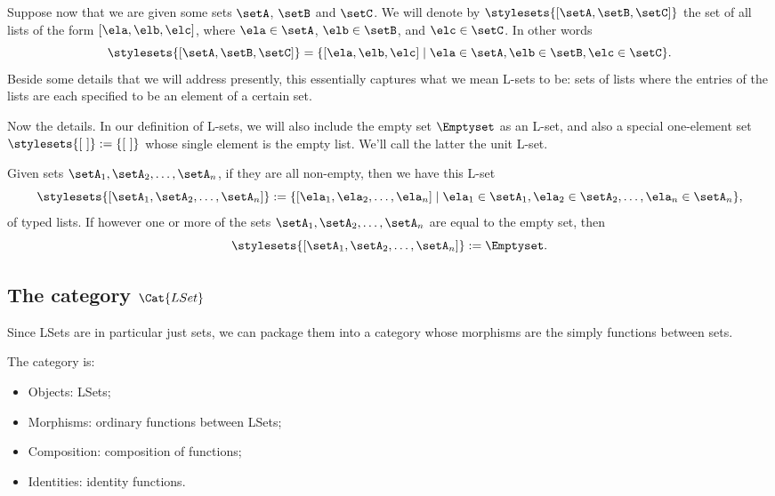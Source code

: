 Suppose now that we are given some sets $\setA$, $\setB$ and $\setC$.  We will denote by $\stylesets{[\setA, \setB, \setC]}$ the set of all lists of the form $[\ela, \elb, \elc]$, where $\ela \in \setA$, $\elb \in \setB$, and $\elc \in \setC$. In other words
\begin{equation}
\stylesets{[\setA, \setB, \setC]} = \{ [\ela, \elb, \elc] \mid \ela \in \setA, \elb \in \setB, \elc \in \setC \}.
\end{equation}
Beside some details that we will address presently, this essentially captures what we mean L-sets to be: sets of lists where the entries of the lists are each specified to be an element of a certain set. 

Now the details. In our definition of L-sets, we will also include the empty set $\Emptyset$ as an L-set, and also a special one-element set $\stylesets{[ \ ]} := \{ [ \ ] \}$ whose single element is the empty list. We'll call the latter the unit L-set. 

Given sets $\setA_1, \setA_2, \dots , \setA_n$, if they are all non-empty, then we have this L-set
\begin{equation}
\stylesets{[\setA_1, \setA_2, \dots, \setA_n]} := \{ [ \ela_1, \ela_2, \dots, \ela_n] \mid \ela_1 \in \setA_1, \ela_2 \in \setA_2, \dots, \ela_n \in \setA_n \},
\end{equation}
of typed lists. 
If however one or more of the sets $\setA_1, \setA_2, \dots , \setA_n$ are equal to the empty set, then \begin{equation}
\stylesets{[\setA_1, \setA_2, \dots, \setA_n]} := \Emptyset. 
\end{equation}


\subsection{The category $\Cat{LSet}$}

Since LSets are in particular just sets, we can package them into a category whose morphisms are the simply functions between sets. 

\begin{ctdefinition}
The category  is: 

\begin{itemize}
\item Objects: LSets;
\item Morphisms: ordinary functions between LSets;
\item Composition: composition of functions;
\item Identities: identity functions. 
\end{itemize}

\end{ctdefinition}

